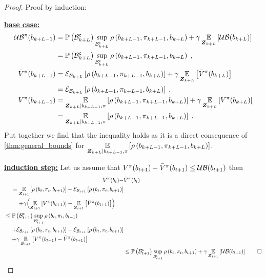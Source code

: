 \begin{proof}
	Proof by induction:

	\textbf{\underline{base case:}}
	\begin{align*}
		\upperbound\nolimits^\pi(\blf{k+L-1})&=\measure{\stcompI{\subSpace}{k+L}}\sup_{\stcompI{\subSpace}{k+L}}\reward{\blf{k+L-1},\pi_{k+L-1},\blf{k+L}}+\gamma\expectation{\upperbound(\blf{k+L})}{\observationsRV{k+L}}\\
		&=\measure{\stcompI{\subSpace}{k+L}}\sup_{\stcompI{\subSpace}{k+L}}\reward{\blf{k+L-1},\pi_{k+L-1},\blf{k+L}}\;,\\
		\bar{V}^\pi(\blf{k+L-1})&=\partialexpectation{\reward{\blf{k+L-1},\pi_{k+L-1},\blf{k+L}}}{\subSpaceI{k+L}}+\gamma\expectation{\bar{V}^\pi(\blf{k+L})}{\observationsRV{k+L}}\\
		&=\partialexpectation{\reward{\blf{k+L-1},\pi_{k+L-1},\blf{k+L}}}{\subSpaceI{k+L}}\;,\\
		V^\pi(\blf{k+L-1})&=\expectation{\reward{\blf{k+L-1},\pi_{k+L-1},\blf{k+L}}}{\observationsRV{k+L}\mid\blf{k+L-1},\pi}+\gamma\expectation{V^\pi(\blf{k+L})}{\observationsRV{k+L}}\\
		&=\expectation{\reward{\blf{k+L-1},\pi_{k+L-1},\blf{k+L}}}{\observationsRV{k+L}\mid\blf{k+L-1},\pi}\;.
	\end{align*}
	Put together we find that the inequality holds as it is a direct consequence of \cref{thm:general_bounds} for $\expectation{\reward{\blf{k+L-1},\pi_{k+L-1},\blf{k+L}}}{\observationsRV{k+L}\mid\blf{k+L-1},\pi}$.

	\textbf{\underline{induction step:}}
	Let us assume that $V^\pi(\blf{t+1})-\bar{V}^\pi(\blf{t+1})\leq\upperbound(\blf{t+1})$ then
	\begin{align*}
		V^\pi(\blf{t})-&\bar{V}^\pi(\blf{t})\\
		\begin{split}
			&=\expectation{\reward{\blf{t},\pi_t,\blf{t+1}}}{\observationsRV{t+1}}-\partialexpectation{\reward{\blf{t},\pi_t,\blf{t+1}}}{\subSpaceI{t+1}}\\
			&\phantomeq+\gamma\Bigl(\expectation{V^\pi(\blf{t+1})}{\observationsRV{t+1}}-\expectation{\bar{V}^\pi(\blf{t+1})}{\observationsRV{t+1}}\Bigr)
		\end{split}\\
		\begin{split}
			&\leq\measure{\stcompI{\subSpace}{t+1}}\sup_{\stcompI{\subSpace}{t+1}}\reward{\blf{t},\pi_t,\blf{t+1}}\\
			&\phantomeq+\partialexpectation{\reward{\blf{t},\pi_t,\blf{t+1}}}{\subSpaceI{t+1}}-\partialexpectation{\reward{\blf{t},\pi_t,\blf{t+1}}}{\subSpaceI{t+1}}\\
			&\phantomeq+\gamma\expectation{V^\pi(\blf{t+1})-\bar{V}^\pi(\blf{t+1})}{\observationsRV{t+1}}
		\end{split}\\
		&\leq\measure{\stcompI{\subSpace}{t+1}}\sup_{\stcompI{\subSpace}{t+1}}\reward{\blf{t},\pi_t,\blf{t+1}}+\gamma\expectation{\upperbound(\blf{t+1})}{\observationsRV{t+1}}\qed
	\end{align*}
\end{proof}

